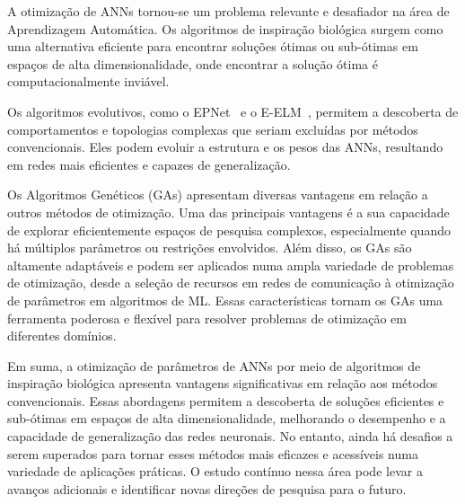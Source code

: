 \documentclass[conference]{IEEEtran}
\begin{document}
    A otimização de ANNs tornou-se um problema relevante e desafiador na área de Aprendizagem Automática.
    Os algoritmos de inspiração biológica surgem como uma alternativa eficiente para encontrar soluções ótimas ou sub-ótimas em espaços de alta dimensionalidade, onde encontrar a solução ótima é computacionalmente inviável.

    Os algoritmos evolutivos, como o EPNet~\cite{Yao1997ANetworks} e o E-ELM~\cite{Zhu2005EvolutionaryMachine}, permitem a descoberta de comportamentos e topologias complexas que seriam excluídas por métodos convencionais.
    Eles podem evoluir a estrutura e os pesos das ANNs, resultando em redes mais eficientes e capazes de generalização.

    Os Algoritmos Genéticos (GAs) apresentam diversas vantagens em relação a outros métodos de otimização.
    Uma das principais vantagens é a sua capacidade de explorar eficientemente espaços de pesquisa complexos, especialmente quando há múltiplos parâmetros ou restrições envolvidos.
    Além disso, os GAs são altamente adaptáveis e podem ser aplicados numa ampla variedade de problemas de otimização, desde a seleção de recursos em redes de comunicação à otimização de parâmetros em algoritmos de ML. Essas características tornam os GAs uma ferramenta poderosa e flexível para resolver problemas de otimização em diferentes domínios.

    Em suma, a otimização de parâmetros de ANNs por meio de algoritmos de inspiração biológica apresenta vantagens significativas em relação aos métodos convencionais.
    Essas abordagens permitem a descoberta de soluções eficientes e sub-ótimas em espaços de alta dimensionalidade, melhorando o desempenho e a capacidade de generalização das redes neuronais.
    No entanto, ainda há desafios a serem superados para tornar esses métodos mais eficazes e acessíveis numa variedade de aplicações práticas.
    O estudo contínuo nessa área pode levar a avanços adicionais e identificar novas direções de pesquisa para o futuro.

    
    
\end{document}
